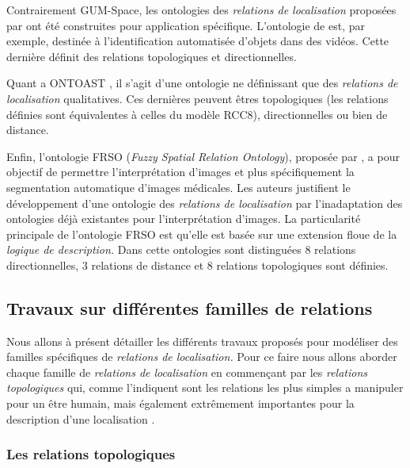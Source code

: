 Contrairement GUM-Space, les ontologies des \emph{relations de
  localisation} proposées par
\textcite{Dasiopoulou2005,Miron2007,Hudelot2008a} ont été construites
pour application spécifique. L'ontologie de \textcite{Dasiopoulou2005}
est, par exemple, destinée à l'identification automatisée d'objets
dans des vidéos. Cette dernière définit des relations topologiques et
directionnelles. 

Quant a ONTOAST \autocite{Miron2007}, il s'agit d'une ontologie ne
définissant que des \emph{relations de localisation} qualitatives. Ces
dernières peuvent êtres topologiques (les relations définies sont
équivalentes à celles du modèle RCC8), directionnelles ou bien de
distance.

Enfin, l'ontologie FRSO (\emph{Fuzzy Spatial Relation Ontology}),
proposée par \textcite{Hudelot2008a}, a pour objectif de permettre
l’interprétation d'images et plus spécifiquement la segmentation
automatique d'images médicales. Les auteurs justifient le
développement d'une ontologie des \emph{relations de localisation} par
l'inadaptation des ontologies déjà existantes pour l'interprétation
d'images.
%
La particularité principale de l'ontologie FRSO est qu'elle est basée
sur une extension floue de la \emph{logique de description.}
%
Dans cette ontologies sont distinguées 8 relations directionnelles, 3
relations de distance et 8 relations topologiques sont définies.

\subsection{Travaux sur différentes familles de relations}

Nous allons à présent détailler les différents travaux proposés pour
modéliser des familles spécifiques de \emph{relations de
  localisation.} Pour ce faire nous allons aborder chaque famille de
\emph{relations de localisation} en commençant par les \emph{relations
  topologiques} qui, comme l'indiquent \textcite{Aurnague1997} sont
les relations les plus simples a manipuler pour un être humain, mais
également extrêmement importantes pour la description d'une
localisation \autocite{Egenhofer1995}.

\subsubsection{Les relations topologiques}

